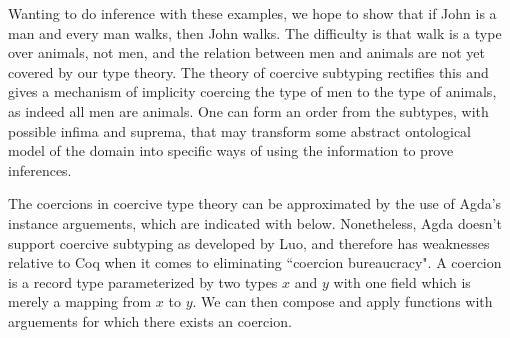Wanting to do inference with these examples, we hope to show that if John is a
man and every man walks, then John walks. The difficulty is that walk is a type
over animals, not men, and the relation between men and animals are not yet
covered by our type theory. The theory of coercive subtyping rectifies this and
gives a mechanism of implicity coercing the type of men to the type of animals,
as indeed all men are animals. One can form an order from the subtypes, with
possible infima and suprema, that may transform some abstract ontological model
of the domain into specific ways of using the information to prove inferences.

The coercions in coercive type theory can be approximated by the use of
Agda's instance arguements, which are indicated with \codeword{{{_}}} below.
Nonetheless, Agda doesn't support coercive subtyping as developed by Luo, and
therefore has weaknesses relative to Coq when it comes to eliminating ``coercion
bureaucracy". A coercion is a record type parameterized by two types $x$ and $y$
with one field  which is merely a mapping from $x$ to $y$. We can then
compose and apply functions with arguements for which there exists an coercion.

